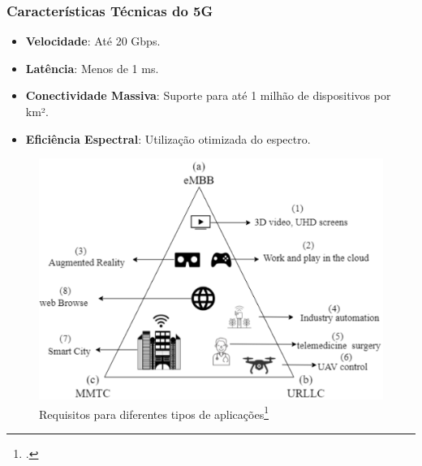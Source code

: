 \begin{frame}
    \frametitle{Características Técnicas do 5G}
    \begin{itemize}
        \item \textbf{Velocidade}: Até 20 Gbps.
        \item \textbf{Latência}: Menos de 1 ms.
        \item \textbf{Conectividade Massiva}: Suporte para até 1 milhão de dispositivos por km².
        \item \textbf{Eficiência Espectral}: Utilização otimizada do espectro.
    \end{itemize}
    \begin{figure}
        \centering
        \includegraphics[width=0.5\linewidth]{figs/5G_verticais.png}
        \caption{Requisitos para diferentes tipos de aplicações\footcite{5G_verticais}}
        \label{fig:enter-label}
    \end{figure}
\end{frame}
